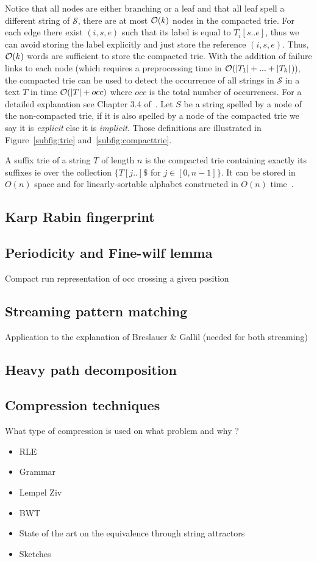 Notice that all nodes are either branching or a leaf and that all leaf spell a different string of $\mathcal{S}$, there are at most $\mathcal{O}(k)$ nodes in the compacted trie.
For each edge there exist $(i,s,e)$ such that its label is equal to $T_i[s .. e]$, thus we can avoid storing the label explicitly and just store the reference $(i,s,e)$.
Thus, $\mathcal{O}(k)$ words are sufficient to store the compacted trie.
%
With the addition of failure links to each node (which requires a preprocessing time in $\mathcal{O}(|T_1| + ... +|T_k|$)), the compacted trie can be used to detect the occurrence of all strings in $\mathcal{S}$ in a text $T$ in time $\mathcal{O}(|T|+occ)$ where $occ$ is the total number of occurrences. For a detailed explanation see Chapter 3.4 of~\cite{Gusfield1997}. Let $S$ be a string spelled by a node of the non-compacted trie, if it is also spelled by a node of the compacted trie we say it is \emph{explicit} else it is \emph{implicit}. Those definitions are illustrated in Figure~\ref{subfig:trie} and~\ref{subfig:compacttrie}.

A suffix trie of a string $T$ of length $n$ is the compacted trie containing exactly its suffixes ie over the collection $\{T[j..]\$$ for $ j \in [0,n-1] \}$. It can be stored in $O(n)$ space and for linearly-sortable alphabet constructed in $O(n)$ time~\cite{}.



\subsection{Karp Rabin fingerprint} 
\subsection{Periodicity and Fine-wilf lemma}
Compact run representation of occ crossing a given position

\subsection{Streaming pattern matching}
Application to the explanation of Breslauer \& Gallil (needed for both streaming)

\subsection{Heavy path decomposition}


\subsection{Compression techniques}
What type of compression is used on what problem and why ?
\begin{itemize}
\item RLE
\item Grammar
\item Lempel Ziv
\item BWT
\item State of the art on the equivalence through string attractors
\item Sketches
\end{itemize}